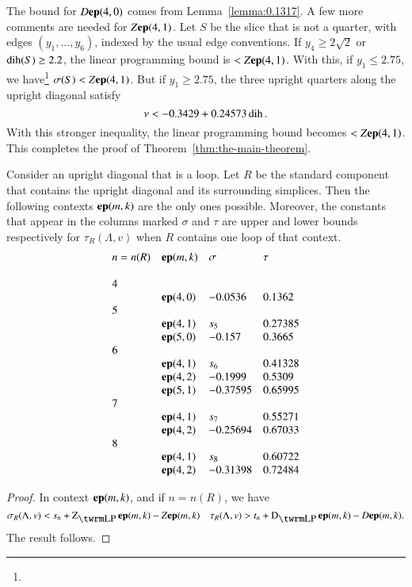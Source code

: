 The bound for $D{\operatorname{\bf ep}}{(4,0)}$ comes from Lemma~\ref{lemma:0.1317}. A few
more comments are needed for $Z{\operatorname{\bf ep}}{(4,1)}$.  Let $S$
be the slice that is not a quarter, with edges $(y_1,\ldots,y_6)$,
indexed by the usual edge conventions.  If $y_4\ge2\sqrt2$
or $\operatorname{dih}(S)\ge 2.2$, the linear programming bound is $<Z{\operatorname{\bf ep}}{(4,1)}$.
With this, if $y_1\le 2.75$, we have\footnote{} %
    $\sigma(S) < Z{\operatorname{\bf ep}}{(4,1)}$.
But if $y_1\ge2.75$, the three upright quarters along the upright
diagonal satisfy
    $$\nu< -0.3429+0.24573\operatorname{dih}.$$
With this stronger inequality, the linear programming bound becomes
$<Z{\operatorname{\bf ep}}{(4,1)}$. This completes the proof of
Theorem~\ref{thm:the-main-theorem}.

\begin{lemma}\label{lemma:loop}
Consider an upright diagonal that is a loop.  Let $R$ be the
standard component that contains the upright diagonal and its
surrounding simplices.   Then the following contexts ${\operatorname{\bf ep}}{(m,k)}$ are the
only ones possible.  Moreover, the constants that appear in the
columns marked $\sigma$ and $\tau$ are upper and lower bounds
respectively for $\tau_R(\Lambda,v)$ when $R$ contains one loop of that
context.
    $$
    \begin{array}{llll}
        n=n(R)&{\operatorname{\bf ep}}{(m,k)} &\sigma &\tau \\
        &&&\\
        4& & &\\
        &{\operatorname{\bf ep}}{(4,0)} &-0.0536 & 0.1362 \\
        5 & & &\\
        &{\operatorname{\bf ep}}{(4,1)} &s_5 &0.27385\\
        &{\operatorname{\bf ep}}{(5,0)} &-0.157   &0.3665\\
        6 & & &\\
        &{\operatorname{\bf ep}}{(4,1)} &s_6 &0.41328\\
        &{\operatorname{\bf ep}}{(4,2)} &-0.1999  &0.5309\\
        &{\operatorname{\bf ep}}{(5,1)} &-0.37595 &0.65995\\
        7 & & &\\
        &{\operatorname{\bf ep}}{(4,1)} &s_7 &0.55271\\
        &{\operatorname{\bf ep}}{(4,2)} &-0.25694 &0.67033\\
        8 & & &\\
        &{\operatorname{\bf ep}}{(4,1)} &s_8 &0.60722\\
        &{\operatorname{\bf ep}}{(4,2)} &-0.31398 &0.72484
    \end{array}
    $$
\end{lemma}

\begin{proof} In context ${\operatorname{\bf ep}}{(m,k)}$, and if $n=n(R)$, we have
    $$
    \sigma_R(\Lambda,v) < s_{n} + \ZLP\y{(m,k)}-Z\y{(m,k)}\quad
    \tau_R(\Lambda,v)> t_{n}+\DLP\y{(m,k)}-D\y{(m,k)}.
    $$
The result follows.
\end{proof}

